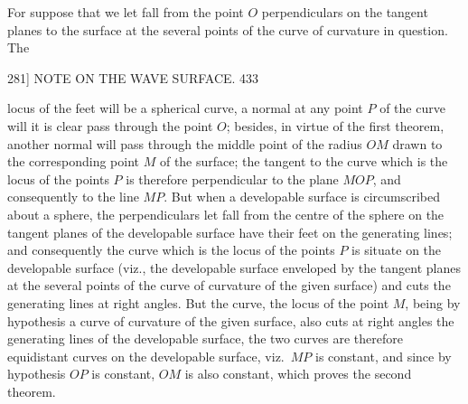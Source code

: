 \documentclass[11pt]{article}
\begin{document}
For suppose that we let fall from the point $O$ perpendiculars on the tangent
planes to the surface at the several points of the curve of curvature in question. The

\begin{center}
\textsc{281]} \hfill NOTE ON THE WAVE SURFACE. \hfill 433
\end{center}

locus of the feet will be a spherical curve, a normal at any point $P$ of the curve
will it is clear pass through the point $O$; besides, in virtue of the first theorem,
another normal will pass through the middle point of the radius $OM$ drawn to the
corresponding point $M$ of the surface; the tangent to the curve which is the locus of
the points $P$ is therefore perpendicular to the plane $MOP$, and consequently to the
line $MP$. But when a developable surface is circumscribed about a sphere, the
perpendiculars let fall from the centre of the sphere on the tangent planes of the
developable surface have their feet on the generating lines; and consequently the
curve which is the locus of the points $P$ is situate on the developable surface
(viz., the developable surface enveloped by the tangent planes at the several points
of the curve of curvature of the given surface) and cuts the generating lines at
right angles. But the curve, the locus of the point $M$, being by hypothesis a curve
of curvature of the given surface, also cuts at right angles the generating lines of
the developable surface, the two curves are therefore equidistant curves on the
developable surface, viz.\ $MP$ is constant, and since by hypothesis $OP$ is constant,
$OM$ is also constant, which proves the second theorem.
\end{document}
